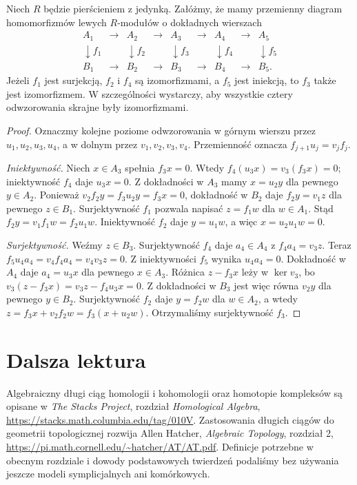 \begin{lemat}
\label{lem:pieciu}
Niech $R$ będzie pierścieniem z jedynką.
Załóżmy, że mamy przemienny diagram
homomorfizmów lewych $R$-modułów o dokładnych
wierszach
\[
\begin{array}{ccccccccc}
A_1&\longrightarrow&A_2&\longrightarrow&A_3&
 \longrightarrow&A_4&\longrightarrow&A_5\\
\downarrow f_1&&\downarrow f_2&&\downarrow f_3&&
\downarrow f_4&&\downarrow f_5\\
B_1&\longrightarrow&B_2&\longrightarrow&B_3&
 \longrightarrow&B_4&\longrightarrow&B_5 .
\end{array}
\]
Jeżeli $f_1$ jest surjekcją, $f_2$ i $f_4$ są
izomorfizmami, a $f_5$ jest iniekcją,
to $f_3$ także jest izomorfizmem.
W szczególności wystarczy, aby wszystkie cztery
odwzorowania skrajne były izomorfizmami.
\end{lemat}
\begin{proof}
Oznaczmy kolejne poziome odwzorowania w górnym
wierszu przez $u_1,u_2,u_3,u_4$,
a w dolnym przez $v_1,v_2,v_3,v_4$.
Przemienność oznacza
$f_{j+1}u_j=v_jf_j$.

\emph{Iniektywność.} Niech $x\in A_3$
spełnia $f_3x=0$.
Wtedy
$f_4(u_3x)=v_3(f_3x)=0$;
iniektywność $f_4$ daje $u_3x=0$.
Z dokładności w $A_3$ mamy
$x=u_2y$ dla pewnego $y\in A_2$.
Ponieważ
$v_2f_2y=f_3u_2y=f_3x=0$,
dokładność w $B_2$ daje
$f_2y=v_1z$ dla pewnego $z\in B_1$.
Surjektywność $f_1$ pozwala napisać
$z=f_1w$ dla $w\in A_1$.
Stąd $f_2y=v_1f_1w=f_2u_1w$.
Iniektywność $f_2$ daje $y=u_1w$,
a więc $x=u_2u_1w=0$.

\emph{Surjektywność.} Weźmy $z\in B_3$.
Surjektywność $f_4$ daje $a_4\in A_4$
z $f_4a_4=v_3z$. Teraz
$f_5u_4a_4=v_4f_4a_4=v_4v_3z=0$.
Z iniektywności $f_5$ wynika
$u_4a_4=0$. Dokładność w $A_4$
daje $a_4=u_3x$ dla pewnego
$x\in A_3$. Różnica
$z-f_3x$ leży w $\ker v_3$,
bo $v_3(z-f_3x)=v_3z-f_4u_3x=0$.
Z dokładności w $B_3$ jest więc
równa $v_2y$ dla pewnego $y\in B_2$.
Surjektywność $f_2$ daje
$y=f_2w$ dla $w\in A_2$, a wtedy
$z=f_3x+v_2f_2w
=f_3(x+u_2w)$.
Otrzymaliśmy surjektywność $f_3$.
\end{proof}

\section*{Dalsza lektura}
Algebraiczny długi ciąg homologii i kohomologii
oraz homotopie kompleksów są opisane w
\emph{The Stacks Project}, rozdział
\emph{Homological Algebra},
\url{https://stacks.math.columbia.edu/tag/010V}.
Zastosowania długich ciągów do geometrii
topologicznej rozwija Allen Hatcher,
\emph{Algebraic Topology}, rozdział 2,
\url{https://pi.math.cornell.edu/~hatcher/AT/AT.pdf}.
Definicje potrzebne w obecnym rozdziale
i dowody podstawowych twierdzeń podaliśmy
bez używania jeszcze modeli
symplicjalnych ani komórkowych.
\clearpage

